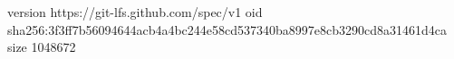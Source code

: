 version https://git-lfs.github.com/spec/v1
oid sha256:3f3ff7b56094644acb4a4bc244e58cd537340ba8997e8cb3290cd8a31461d4ca
size 1048672
